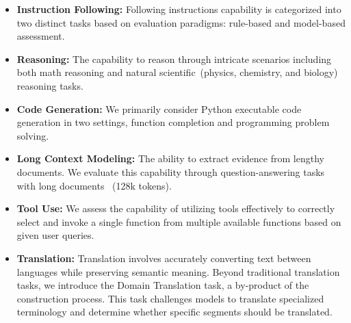 \begin{itemize} [nosep,itemsep=1pt,leftmargin=0.1cm]
    \item \textbf{Instruction Following:}  Following instructions capability is categorized into two distinct tasks based on evaluation paradigms: rule-based and model-based assessment.
    \item \textbf{Reasoning:} The capability to reason through intricate scenarios including both math reasoning and natural scientific~(physics, chemistry, and biology) reasoning tasks.
    \item \textbf{Code Generation:} We primarily consider Python executable code generation in two settings, function completion and programming problem solving.
    \item \textbf{Long Context Modeling:} The ability to extract evidence from lengthy documents. We evaluate this capability through question-answering tasks with long documents ~(128k tokens).
    \item \textbf{Tool Use:} We assess the capability of utilizing tools effectively to correctly select and invoke a single function from multiple available functions based on given user queries.
    \item \textbf{Translation:} Translation involves accurately converting text between languages while preserving semantic meaning. Beyond traditional translation tasks, we introduce the Domain Translation task, a by-product of the \name construction process. This task challenges models to translate specialized terminology and determine whether specific segments should be translated.
\end{itemize}

